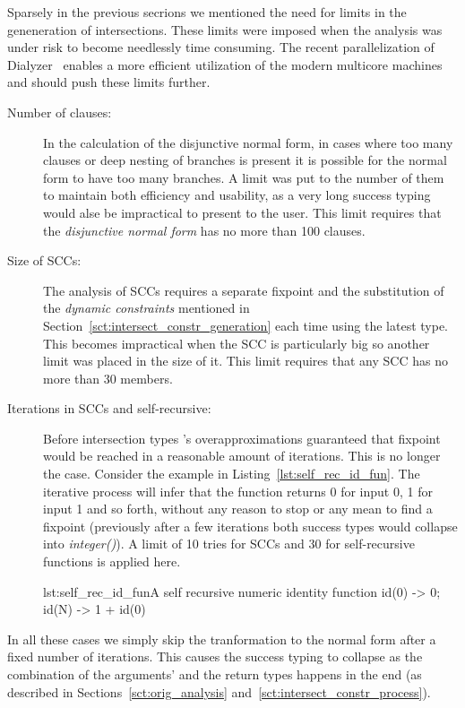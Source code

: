 Sparsely in the previous secrions we mentioned the need for limits in
the geneneration of intersections. These limits were imposed when the
analysis was under risk to become needlessly time consuming. The
recent parallelization of Dialyzer~\cite{Ypatia} enables a more
efficient utilization of the modern multicore machines and should push
these limits further.
\begin{description}
\item[Number of clauses:] In the calculation of the disjunctive normal
  form, in cases where too many clauses or deep nesting of branches is
  present it is possible for the normal form to have too many
  branches. A limit was put to the number of them to maintain both
  efficiency and usability, as a very long success typing would alse
  be impractical to present to the user. This limit requires that the
  \emph{disjunctive normal form} has no more than 100 clauses.
\item[Size of SCCs:] The analysis of SCCs requires a separate fixpoint
  and the substitution of the \emph{dynamic constraints} mentioned in
  Section~\ref{sct:intersect_constr_generation} each time using the
  latest type. This becomes impractical when the SCC is particularly
  big so another limit was placed in the size of it. This limit
  requires that any SCC has no more than 30 members.
\item[Iterations in SCCs and self-recursive:] Before intersection
  types \dr's overapproximations guaranteed that fixpoint would be
  reached in a reasonable amount of iterations. This is no longer the
  case. Consider the example in Listing~\ref{lst:self_rec_id_fun}. The
  iterative process will infer that the function returns 0 for input
  0, 1 for input 1 and so forth, without any reason to stop or any
  mean to find a fixpoint (previously after a few iterations both
  success types would collapse into \emph{integer()}). A limit of 10
  tries for SCCs and 30 for self-recursive functions is applied here.
  \begin{console}{lst:self_rec_id_fun}{A self recursive numeric identity function}
    id(0) -> 0;
    id(N) -> 1 + id(0)
  \end{console}
\end{description}

In all these cases we simply skip the tranformation to the normal form
after a fixed number of iterations. This causes the success typing to
collapse as the combination of the arguments' and the return types
happens in the end (as described in Sections~\ref{sct:orig_analysis}
and~\ref{sct:intersect_constr_process}).

